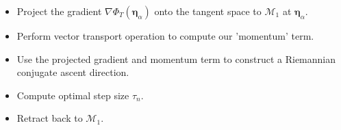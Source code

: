 \documentclass{beamer}
\def\Bmp#1{ \begin{minipage}{#1} }
\def\Emp{ \end{minipage} }
\def\hdo{\dot{H}^1}
\def\pat{\Phi_{\alpha,T}}
\def\ppat{\Phi'_{\alpha,T}}
\def\M{{\mathcal{M}}}
\newcommand{\la}{\left\langle}
\newcommand{\ra}{\right\rangle}
\def\a{\hat{\text{a}}}
\def\be{{\boldsymbol \eta}}
\def\bep{{\boldsymbol \eta'}}
\def\bea{{\boldsymbol \eta_\alpha}}
\def\bepa{{\boldsymbol \eta'_\alpha}}
\def\upa{\boldsymbol u'_\alpha}
\def\usa{\boldsymbol u^*_\alpha}
\def\x{{\bf x}}
\def\ua{\boldsymbol u_\alpha}
\begin{document}

\frame
{
\hspace*{-1.0cm}
\Bmp{12cm}
\raggedright

\begin{itemize}

\item<1->
Project the gradient $\nabla\Phi_T(\bea)$ onto the tangent space to $\M_1$ at $\bea$.
\medskip

\item<2->
Perform vector transport operation to compute our 'momentum' term.
\medskip

\item<3->
Use the projected gradient and momentum term to construct a Riemannian conjugate ascent direction.

\item<4->
Compute optimal step size $\tau_n$.

\item<5->
Retract back to $\M_1$.

\end{itemize}
\Emp
}
\end{document}
